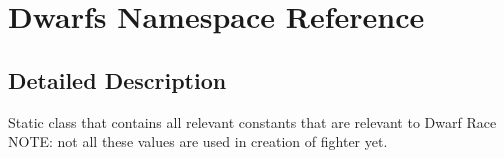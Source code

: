 \hypertarget{namespace_dwarfs}{}\section{Dwarfs Namespace Reference}
\label{namespace_dwarfs}


\subsection{Detailed Description}
Static class that contains all relevant constants that are relevant to Dwarf Race N\+O\+TE\+: not all these values are used in creation of fighter yet. 
